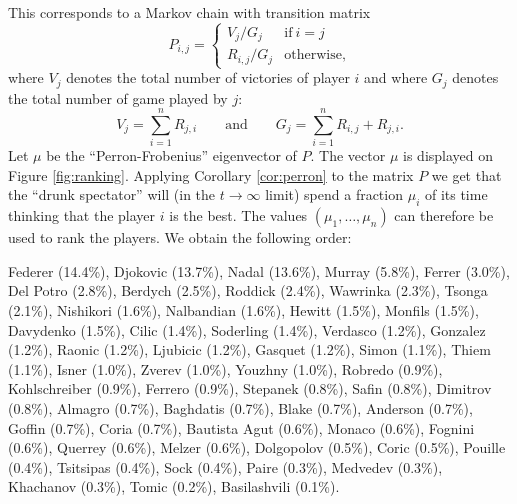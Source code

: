 \documentclass[11pt,nocut]{article}
\begin{document}
This corresponds to a Markov chain with transition matrix
$$
P_{i,j} = 
\begin{cases}
	V_j/G_j & \text{if} \ i = j \\
	R_{i,j}/G_j & \text{otherwise,}
\end{cases}
$$
where $V_j$ denotes the total number of victories of player $i$ and where $G_j$ denotes the total number of game played by $j$:
$$
V_{j} = \sum_{i=1}^n R_{j,i} \qquad \text{and} \qquad G_j = \sum_{i=1}^n R_{i,j} + R_{j,i}.
$$
Let $\mu$ be the ``Perron-Frobenius'' eigenvector of $P$. The vector $\mu$ is displayed on Figure \ref{fig:ranking}.
Applying Corollary \ref{cor:perron} to the matrix $P$ we get that the ``drunk spectator'' will (in the $t \to \infty$ limit) spend a fraction $\mu_i$ of its time thinking that the player $i$ is the best. The values $(\mu_1, \dots, \mu_n)$ can therefore be used to rank the players. We obtain the following order:
\begin{center}
Federer (14.4\%),
Djokovic (13.7\%),
Nadal (13.6\%),
Murray (5.8\%),
Ferrer (3.0\%),
Del Potro (2.8\%),
Berdych (2.5\%),
Roddick (2.4\%),
Wawrinka (2.3\%),
Tsonga (2.1\%),
Nishikori (1.6\%),
Nalbandian (1.6\%),
Hewitt (1.5\%),
Monfils (1.5\%),
Davydenko (1.5\%),
Cilic (1.4\%),
Soderling (1.4\%),
Verdasco (1.2\%),
Gonzalez (1.2\%),
Raonic (1.2\%),
Ljubicic (1.2\%),
Gasquet (1.2\%),
Simon (1.1\%),
Thiem (1.1\%),
Isner (1.0\%),
Zverev (1.0\%),
Youzhny (1.0\%),
Robredo (0.9\%),
Kohlschreiber (0.9\%),
Ferrero (0.9\%),
Stepanek (0.8\%),
Safin (0.8\%),
Dimitrov (0.8\%),
Almagro (0.7\%),
Baghdatis (0.7\%),
Blake (0.7\%),
Anderson (0.7\%),
Goffin (0.7\%),
Coria (0.7\%),
Bautista Agut (0.6\%),
Monaco (0.6\%),
Fognini (0.6\%),
Querrey (0.6\%),
Melzer (0.6\%),
Dolgopolov (0.5\%),
Coric (0.5\%),
Pouille (0.4\%),
Tsitsipas (0.4\%),
Sock (0.4\%),
Paire (0.3\%),
Medvedev (0.3\%),
Khachanov (0.3\%),
Tomic (0.2\%),
Basilashvili (0.1\%).
\end{center}
\end{document}

